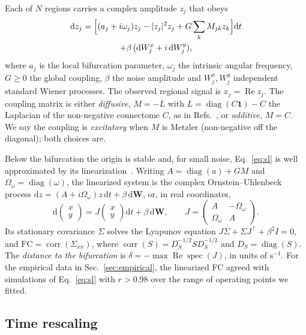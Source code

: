 \documentclass[aip,cha,reprint,amsmath,amssymb]{revtex4-2}
\theoremstyle{remark}
\newcommand{\one}{\mathbf 1}
\newcommand{\corr}{\operatorname{corr}}
\newcommand{\diag}{\operatorname{diag}}
\newcommand{\FC}{\mathrm{FC}}
\begin{document}
Each of $N$ regions carries a complex amplitude $z_j$ that obeys
\begin{multline}\label{eq:sl}
  \mathrm dz_j=\Bigl[(a_j+i\omega_j)z_j-|z_j|^2z_j+G\sum_{k}M_{jk}z_k\Bigr]\mathrm dt\\
  +\beta\,(\mathrm dW^x_j+i\,\mathrm dW^y_j),
\end{multline}
where $a_j$ is the local bifurcation parameter, $\omega_j$ the intrinsic angular frequency, $G\ge0$ the global coupling, $\beta$ the noise amplitude and $W^x_j,W^y_j$ independent standard Wiener processes. The observed regional signal is $x_j=\operatorname{Re}z_j$. The coupling matrix is either \emph{diffusive}, $M=-L$ with $L=\diag(C\one)-C$ the Laplacian of the non-negative connectome $C$, as in Refs.~, or \emph{additive}, $M=C$. We say the coupling is \emph{excitatory} when $M$ is Metzler (non-negative off the diagonal); both choices are.

Below the bifurcation the origin is stable and, for small noise, Eq.~\eqref{eq:sl} is well approximated by its linearization~\cite{PonceAlvarez2024}. Writing $A=\diag(a)+GM$ and $\Omega_\omega=\diag(\omega)$, the linearized system is the complex Ornstein--Uhlenbeck process $\mathrm dz=(A+i\Omega_\omega)z\,\mathrm dt+\beta\,\mathrm d\mathbf W$, or, in real coordinates,
\begin{equation}\label{eq:jac}
  \mathrm d\begin{pmatrix}x\\y\end{pmatrix}=J\begin{pmatrix}x\\y\end{pmatrix}\mathrm dt+\beta\,\mathrm d\mathbf W,\qquad
  J=\begin{pmatrix}A&-\Omega_\omega\\ \Omega_\omega&A\end{pmatrix}.
\end{equation}
Its stationary covariance $\Sigma$ solves the Lyapunov equation $J\Sigma+\Sigma J^\top+\beta^2I=0$, and $\FC=\corr(\Sigma_{xx})$, where $\corr(S)=D_S^{-1/2}SD_S^{-1/2}$ and $D_S=\diag(S)$. The \emph{distance to the bifurcation} is $\delta=-\max\operatorname{Re}\operatorname{spec}(J)$, in units of $\mathrm{s}^{-1}$. For the empirical data in Sec.~\ref{sec:empirical}, the linearized FC agreed with simulations of Eq.~\eqref{eq:sl} with $r>0.98$ over the range of operating points we fitted.

\subsection{Time rescaling}
\end{document}
